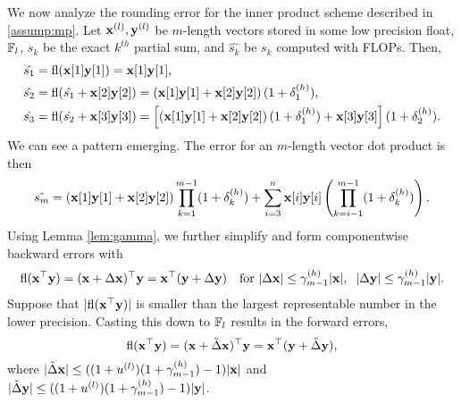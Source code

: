 We now analyze the rounding error for the inner product scheme described in \cref{assump:mp}.
Let $\mathbf{x}^{(l)},\mathbf{y}^{(l)}$ be $m$-length vectors stored in some low precision float, $\mathbb{F}_l$, $s_k$ be the exact $k^{th}$ partial sum, and $\hat{s_k}$ be $s_k$ computed with FLOPs.
Then,
\begin{align*}
\hat{s_1} &= \mathrm{fl} (\mathbf{x}[1]\mathbf{y}[1]) = \mathbf{x}[1]\mathbf{y}[1],\\
\hat{s_2} &= \mathrm{fl}(\hat{s_1} + \mathbf{x}[2]\mathbf{y}[2]) = \left(\mathbf{x}[1]\mathbf{y}[1]+ \mathbf{x}[2]\mathbf{y}[2]\right)(1+\delta_{1}^{(h)}),\\
\hat{s_3} &= \mathrm{fl}(\hat{s_2}+\mathbf{x}[3]\mathbf{y}[3]) = \left[\left(\mathbf{x}[1]\mathbf{y}[1] + \mathbf{x}[2]\mathbf{y}[2]\right)(1+\delta_{1}^{(h)})  + \mathbf{x}[3]\mathbf{y}[3]\right](1+\delta_{2}^{(h)}).
\end{align*}
We can see a pattern emerging. 
The error for an $m$-length vector dot product is then
\begin{equation}
\label{eqn:dperr_2}
\hat{s_m} = (\bb{x}[1]\bb{y}[1]+\bb{x}[2]\bb{y}[2])\prod_{k=1}^{m-1}(1+\dd_{k}^{(h)}) + \sum_{i=3}^n \bb{x}[i]\bb{y}[i]\left(\prod_{k=i-1}^{m-1}(1+\dd_{k}^{(h)})\right).
\end{equation}
Using Lemma \ref{lem:gamma}, we further simplify and form componentwise backward errors with
\begin{equation}
\fl(\bb{x}^{\top}\bb{y}) =(\bb{x}+\Delta\bb{x})^{\top}\bb{y} = \bb{x}^{\top}(\bb{y}+\Delta\bb{y})\quad\text{for }|\Delta \bb{x}| \leq \gamma^{(h)}_{m-1}|\bb{x}|,\;\; |\Delta \bb{y}|  \leq \gamma_{m-1}^{(h)}|\bb{y}|. \label{eqn:beforecd}
\end{equation}
Suppose that $|\mathrm{fl}(\mathbf{x}^{\top}\mathbf{y})|$ is smaller than the largest representable number in the lower precision.
Casting this down to $\mathbb{F}_l$ results in the forward errors, 
\begin{equation}
\fl(\bb{x}^{\top}\bb{y}) = (\bb{x}+\tilde{\Delta}\bb{x})^{\top}\bb{y} = \bb{x}^{\top}(\bb{y}+\tilde{\Delta}\bb{y}), \label{eqn:aftercd}
\end{equation}
where $|\tilde{\Delta} \mathbf{x}| \leq ((1+u^{(l)})(1+\gamma_{m-1}^{(h)})-1)|\mathbf{x}|$ and $|\tilde{\Delta} \mathbf{y}| \leq ((1+u^{(l)})(1+\gamma_{m-1}^{(h)})-1)|\mathbf{y}|$.

